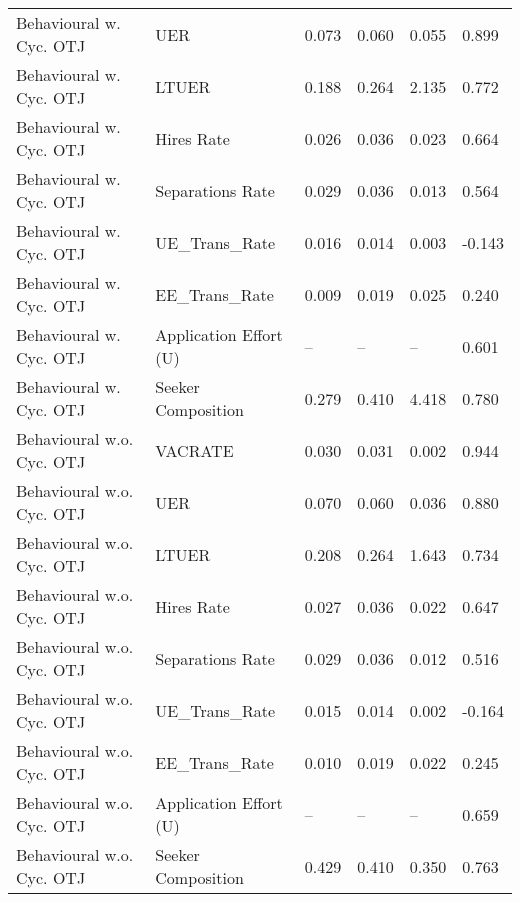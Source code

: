 \begin{table}[ht]
\begin{adjustbox}{width=\textwidth}
\begin{tabular}{llllll}
Behavioural w. Cyc. OTJ & UER & 0.073 & 0.060 & 0.055 & 0.899 \\
Behavioural w. Cyc. OTJ & LTUER & 0.188 & 0.264 & 2.135 & \cellcolor{yellow!25}0.772 \\
Behavioural w. Cyc. OTJ & Hires Rate & 0.026 & 0.036 & 0.023 & \cellcolor{yellow!25}0.664 \\
Behavioural w. Cyc. OTJ & Separations Rate & 0.029 & 0.036 & 0.013 & \cellcolor{yellow!25}0.564 \\
Behavioural w. Cyc. OTJ & UE_Trans_Rate & 0.016 & 0.014 & 0.003 & \cellcolor{yellow!25}-0.143 \\
Behavioural w. Cyc. OTJ & EE_Trans_Rate & 0.009 & 0.019 & 0.025 & 0.240 \\
Behavioural w. Cyc. OTJ & Application Effort (U) & -- & -- & -- & 0.601 \\
Behavioural w. Cyc. OTJ & Seeker Composition & 0.279 & 0.410 & 4.418 & 0.780 \\
Behavioural w.o. Cyc. OTJ & VACRATE & 0.030 & 0.031 & 0.002 & 0.944 \\
Behavioural w.o. Cyc. OTJ & UER & 0.070 & 0.060 & 0.036 & 0.880 \\
Behavioural w.o. Cyc. OTJ & LTUER & \cellcolor{yellow!25}0.208 & 0.264 & \cellcolor{yellow!25}1.643 & 0.734 \\
Behavioural w.o. Cyc. OTJ & Hires Rate & 0.027 & 0.036 & 0.022 & 0.647 \\
Behavioural w.o. Cyc. OTJ & Separations Rate & 0.029 & 0.036 & 0.012 & 0.516 \\
Behavioural w.o. Cyc. OTJ & UE_Trans_Rate & \cellcolor{yellow!25}0.015 & 0.014 & \cellcolor{yellow!25}0.002 & -0.164 \\
Behavioural w.o. Cyc. OTJ & EE_Trans_Rate & 0.010 & 0.019 & 0.022 & \cellcolor{yellow!25}0.245 \\
Behavioural w.o. Cyc. OTJ & Application Effort (U) & -- & -- & -- & \cellcolor{yellow!25}0.659 \\
Behavioural w.o. Cyc. OTJ & Seeker Composition & \cellcolor{yellow!25}0.429 & 0.410 & \cellcolor{yellow!25}0.350 & 0.763 \\
\bottomrule
\end{tabular}
\end{adjustbox}
\end{table}
